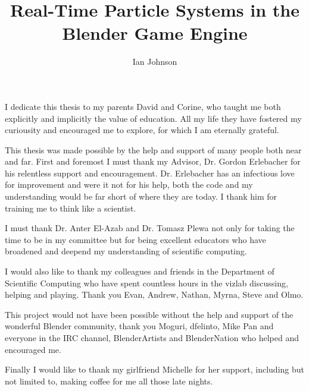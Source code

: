 \documentclass[11pt]{fsuthesis}
\title{Real-Time Particle Systems in the Blender Game Engine}
\author{Ian Johnson}
\begin{document}
\frontmatter
\maketitle
\makesignaturepage

\begin{dedication}
I dedicate this thesis to my parents David and Corine, who taught me both
explicitly and implicitly the value of education. All my life they have
fostered my curiousity and encouraged me to explore, for which I am eternally
grateful.
\end{dedication}

\begin{acknowledgments}
This thesis was made possible by the help and support of many people both near and far.
First and foremost I must thank my Advisor, Dr. Gordon Erlebacher for his
relentless support and encouragement. Dr. Erlebacher has an infectious love for
improvement and were it not for his help, both the code and my understanding
would be far short of where they are today. I thank him for training me to think like a scientist.

I must thank Dr. Anter El-Azab and Dr. Tomasz Plewa not only for taking the
time to be in my committee but for being excellent educators who have broadened
and deepend my understanding of scientific computing.

I would also like to thank my colleagues and friends in the Department of Scientific
Computing who have spent countless hours in the vizlab discussing, helping and
playing. Thank you Evan, Andrew, Nathan, Myrna, Steve and Olmo.

This project would not have been possible without the help and support of the
wonderful Blender community, thank you Moguri, dfelinto, Mike Pan and everyone
in the IRC channel, BlenderArtists and BlenderNation who helped and encouraged
me.

Finally I would like to thank my girlfriend Michelle for her support, including
but not limited to, making coffee for me all those late nights.
\end{acknowledgments}

\tableofcontents
\listoffigures


\end{document}
